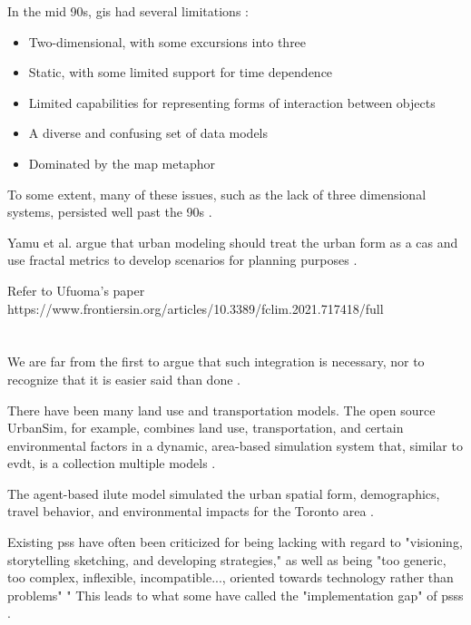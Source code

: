 In the mid 90s, \ac{gis} had several limitations \cite{goodchildGeographicInformationSystems1994}:

\begin{itemize}
    \setlength{\itemsep}{0pt}%
    \setlength{\parskip}{0pt}%
	\item{Two-dimensional, with some excursions into three}
	\item{Static, with some limited support for time dependence}
	\item{Limited capabilities for representing forms of interaction between objects}
	\item{A diverse and confusing set of data models}
	\item{Dominated by the map metaphor}
\end{itemize}

To some extent, many of these issues, such as the lack of three dimensional systems, persisted well past the 90s \cite{goodchildTwentyYearsProgress2010}.

Yamu et al. argue that urban modeling should treat the urban form as a \ac{cas} and use fractal metrics to develop scenarios for planning purposes \cite{yamuAssumingItAll2016}.

Refer to Ufuoma's paper https://www.frontiersin.org/articles/10.3389/fclim.2021.717418/full


\section{}


We are far from the first to argue that such integration is necessary, nor to recognize that it is easier said than done \cite{shahumyanIntegrationLandUse2017}.

There have been many land use and transportation models. The open source UrbanSim, for example, combines land use, transportation, and certain environmental factors in a dynamic, area-based simulation system that, similar to \ac{evdt}, is a collection multiple models \cite{waddellUrbanSimModelingUrban2002}.

The agent-based \ac{ilute} model simulated the urban spatial form, demographics, travel behavior, and environmental impacts for the Toronto area \cite{millerHistoricalValidationIntegrated2011}.

Existing \ac{pss} have often been criticized for being lacking with regard to "visioning, storytelling sketching, and developing strategies," as well as being "too generic, too complex, inflexible, incompatible..., oriented towards technology rather than problems" \cite{brommelstroetPlanningSupportSystems2010}" This leads to what some have called the "implementation gap" of \acp{pss} \cite{BottlenecksBlockingWidespread}.

